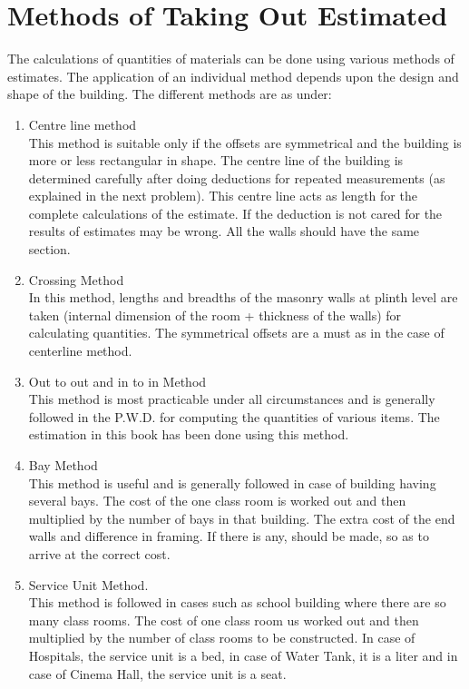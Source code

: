 \section{Methods of Taking Out Estimated}
The calculations of quantities of materials can be done using various methods of estimates. The application of an individual method depends upon the design and shape of the building. The different methods are as under:  \\
\begin{enumerate}
\item Centre line method\\ 
This method is suitable only if the offsets are symmetrical and the building is more or less rectangular in shape. The centre line of the building is determined carefully after doing deductions for repeated measurements (as explained in the next problem). This centre line acts as length for the complete calculations of the estimate. If the deduction is not cared for the results of estimates may be wrong. All the walls should have the same section. 
\item Crossing Method \\
In this method, lengths and breadths of the masonry walls at plinth level are taken (internal dimension of the room + thickness of the walls) for calculating quantities. The symmetrical offsets are a must as in the case of centerline method. 
\item Out to out and  in to in Method \\
  This method is most practicable under all circumstances and is generally followed in the P.W.D. for computing the quantities of various items. The estimation in this book has been done using this method. 
\item Bay Method \\
       This method is useful and is generally followed in case of building having several bays. The cost of the one class room is worked out and then multiplied by the number of bays in that building. The extra cost of the end walls and difference in framing. If there is any, should be made, so as to arrive at the correct cost. 
\item Service Unit Method. \\
This method is followed in cases such as school building where there are so many class rooms.  The cost of one class room us worked out and then multiplied by the number of class rooms to be constructed.   In case of Hospitals, the service unit is a bed, in case of Water Tank, it is a liter and in case of  Cinema Hall, the service unit is a seat.

\end{enumerate}
